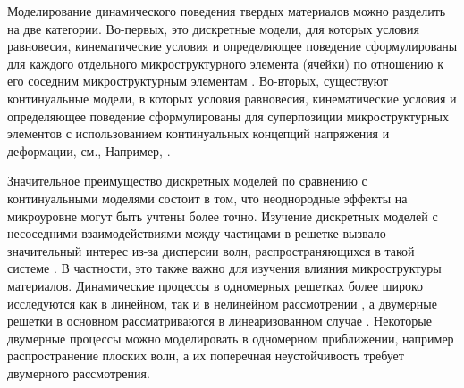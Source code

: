 Моделирование динамического поведения твердых материалов можно разделить на две категории. Во-первых, это дискретные модели, для которых условия равновесия, кинематические условия и определяющее поведение сформулированы для каждого отдельного микроструктурного элемента (ячейки) по отношению к его соседним микроструктурным элементам \cite{Born, AskMetr, Askar, Ostoja}. Во-вторых, существуют континуальные модели, в которых условия равновесия, кинематические условия и определяющее поведение сформулированы для суперпозиции микроструктурных элементов с использованием континуальных концепций напряжения и деформации, см., Например, \cite{Maug, engbook97, erofeev}.
	
Значительное преимущество дискретных моделей по сравнению с континуальными моделями состоит в том, что неоднородные эффекты на микроуровне могут быть учтены более точно. Изучение дискретных моделей с несоседними взаимодействиями между частицами в решетке вызвало значительный интерес из-за дисперсии волн, распространяющихся в такой системе \cite{AskMetr, Maug, Manev, Andrianov, Kosev, Mich, erem}. В частности, это также важно для изучения влияния микроструктуры материалов. Динамические процессы в одномерных решетках более широко исследуются как в линейном, так и в нелинейном рассмотрении \cite{Ostoja, Maug}, а двумерные решетки в основном рассматриваются в линеаризованном случае \cite{AskMetr, Ostoja, Tov}. Некоторые двумерные процессы можно моделировать в одномерном приближении, например распространение плоских волн, а их поперечная неустойчивость требует двумерного рассмотрения. 

